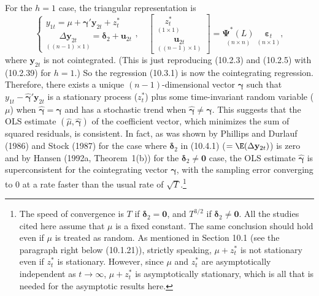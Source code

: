 For the $h = 1$ case, the triangular representation is
\begin{equation}
  \begin{cases}
    y_{1t} = \mu + \boldsymbol{\gamma}' \mathbf{y}_{2t} + z_t^* \\[3pt]
    \underset{((n-1) \times 1)}{\Delta \mathbf{y}_{2t}}
      = \boldsymbol{\delta}_2 + \mathbf{u}_{2t}
  \end{cases}, \quad
  \begin{bmatrix}
    \underset{(1 \times 1)}{z_t^*} \\[3pt]
    \underset{((n-1) \times 1)}{\mathbf{u}_{2t}}
  \end{bmatrix}
  = \underset{(n \times n)}{\boldsymbol{\Psi}^*(L)} \;
    \underset{(n \times 1)}{\boldsymbol{\varepsilon}_t},
  \label{eq:10.4.1} \tag{10.4.1}
\end{equation}
where $\mathbf{y}_{2t}$ is not cointegrated. (This is just reproducing (10.2.3) and (10.2.5) with
(10.2.39) for $h = 1$.) So the regression (10.3.1) is now the cointegrating regression.
Therefore, there exists a unique $(n - 1)$-dimensional vector $\boldsymbol{\gamma}$ such that
$y_{1t} - \hat{\boldsymbol{\gamma}}'\mathbf{y}_{2t}$
is a stationary process ($z_t^*$) plus some time-invariant random variable ($\mu$) when
$\hat{\boldsymbol{\gamma}} = \boldsymbol{\gamma}$ and has a stochastic trend when
$\hat{\boldsymbol{\gamma}} \neq \boldsymbol{\gamma}$. This suggests that the OLS estimate
$(\hat{\mu}, \hat{\boldsymbol{\gamma}})$ of the coefficient vector, which minimizes the sum of squared residuals,
is consistent. In fact, as was shown by Phillips and Durlauf (1986) and Stock
(1987) for the case where $\boldsymbol{\delta}_2$ in (10.4.1) ($= \E(\Delta\mathbf{y}_{2t})$) is zero and by Hansen (1992a,
Theorem~1(b)) for the $\boldsymbol{\delta}_2 \neq \mathbf{0}$ case, the OLS estimate $\hat{\boldsymbol{\gamma}}$ is superconsistent for the
cointegrating vector $\boldsymbol{\gamma}$, with the sampling error converging to 0 at a rate faster than
the usual rate of $\sqrt{T}$.\footnote{%
The speed of convergence is $T$ if $\boldsymbol{\delta}_2 = \mathbf{0}$, and $T^{3/2}$ if $\boldsymbol{\delta}_2 \neq \mathbf{0}$. All the studies cited here assume that $\mu$
is a fixed constant. The same conclusion should hold even if $\mu$ is treated as random. As mentioned in Section
10.1 (see the paragraph right below (10.1.21)), strictly speaking, $\mu + z_t^*$ is not stationary even if $z_t^*$ is stationary.
However, since $\mu$ and $z_t^*$ are asymptotically independent as $t \to \infty$, $\mu + z_t^*$ is asymptotically stationary, which
is all that is needed for the asymptotic results here.}
